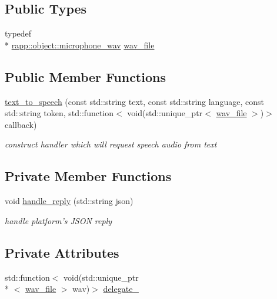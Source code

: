 \subsection*{Public Types}
\begin{DoxyCompactItemize}
\item 
typedef \\*
\hyperlink{classrapp_1_1object_1_1microphone__wav}{rapp\-::object\-::microphone\-\_\-wav} \hyperlink{classrapp_1_1cloud_1_1text__to__speech_a13ce0c09ae955dc6ad999e85f7ef261a}{wav\-\_\-file}
\end{DoxyCompactItemize}
\subsection*{Public Member Functions}
\begin{DoxyCompactItemize}
\item 
\hyperlink{classrapp_1_1cloud_1_1text__to__speech_a41ed41979830a82e124f0f51e0fef828}{text\-\_\-to\-\_\-speech} (const std\-::string text, const std\-::string language, const std\-::string token, std\-::function$<$ void(std\-::unique\-\_\-ptr$<$ \hyperlink{classrapp_1_1cloud_1_1text__to__speech_a13ce0c09ae955dc6ad999e85f7ef261a}{wav\-\_\-file} $>$)$>$ callback)
\begin{DoxyCompactList}\small\item\em construct handler which will request speech audio from text \end{DoxyCompactList}\end{DoxyCompactItemize}
\subsection*{Private Member Functions}
\begin{DoxyCompactItemize}
\item 
void \hyperlink{classrapp_1_1cloud_1_1text__to__speech_a032f801177fdf793afa21b8ebc79ce4c}{handle\-\_\-reply} (std\-::string json)
\begin{DoxyCompactList}\small\item\em handle platform's J\-S\-O\-N reply \end{DoxyCompactList}\end{DoxyCompactItemize}
\subsection*{Private Attributes}
\begin{DoxyCompactItemize}
\item 
std\-::function$<$ void(std\-::unique\-\_\-ptr\\*
$<$ \hyperlink{classrapp_1_1cloud_1_1text__to__speech_a13ce0c09ae955dc6ad999e85f7ef261a}{wav\-\_\-file} $>$ wav)$>$ \hyperlink{classrapp_1_1cloud_1_1text__to__speech_ae8a699bb3ef79a4af941d4baddaadc7b}{delegate\-\_\-}
\end{DoxyCompactItemize}
